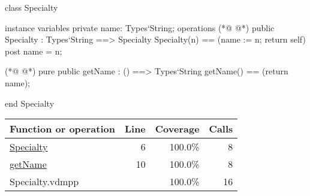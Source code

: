 \begin{vdmpp}[breaklines=true]
class Specialty

instance variables
  private name: Types`String;
operations
(*@
\label{Specialty:6}
@*)
 public Specialty : Types`String ==> Specialty
  Specialty(n) == (name := n; return self)
 post name = n;
  
(*@
\label{getName:10}
@*)
 pure public getName : () ==> Types`String
  getName() == (return name);

end Specialty
\end{vdmpp}
\bigskip
\begin{longtable}{|l|r|r|r|}
\hline
Function or operation & Line & Coverage & Calls \\
\hline
\hline
\hyperref[Specialty:6]{Specialty} & 6&100.0\% & 8 \\
\hline
\hyperref[getName:10]{getName} & 10&100.0\% & 8 \\
\hline
\hline
Specialty.vdmpp & & 100.0\% & 16 \\
\hline
\end{longtable}

